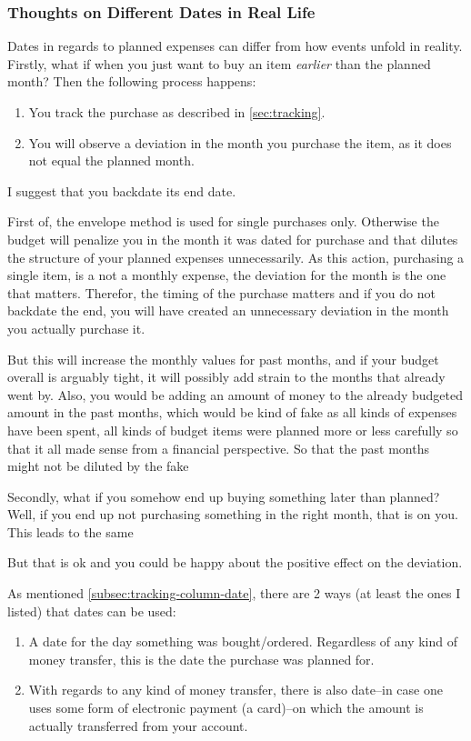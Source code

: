 \subsubsection{Thoughts on Different Dates in Real Life}
\label{subsubsec:thoughts-different-dates}

Dates in regards to planned expenses can differ from how events unfold in reality.
Firstly, what if when you just want to buy an item \emph{earlier} than the planned month?
Then the following process happens:
\begin{enumerate}
	\item You track the purchase as described in \autoref{sec:tracking}.
	\item You will observe a deviation in the month you purchase the item, as it does not equal the planned month.
\end{enumerate}
I suggest that you backdate its end date.

First of, the envelope method is used for single purchases only.
Otherwise the budget will penalize you in the month it was dated for purchase and that dilutes the structure of your planned expenses unnecessarily.
As this action, \ie purchasing a single item, is a not a monthly expense, the deviation for the month is the one that matters.
Therefor, the timing of the purchase matters and if you do not backdate the end, you will have created an unnecessary deviation in the month you actually purchase it.

But this will increase the monthly values for past months, and if your budget overall is arguably tight, it will possibly add strain to the months that already went by.
Also, you would be adding an amount of money to the already budgeted amount in the past months, which would be kind of fake as all kinds of expenses have been spent, all kinds of budget items were planned more or less carefully so that it all made sense from a financial perspective.
So that the past months might not be diluted by the fake 

Secondly, what if you somehow end up buying something later than planned?
Well, if you end up not purchasing something in the right month, that is on you.
This leads to the same 

But that is ok and you could be happy about the positive effect on the deviation.

As mentioned \autoref{subsec:tracking-column-date}, there are 2 ways (at least the ones I listed) that dates can be used:
\begin{enumerate}
	\item A date for the day something was bought/ordered.
	Regardless of any kind of money transfer, this is the date the purchase was planned for.
	\item With regards to any kind of money transfer, there is also date--in case one uses some form of electronic payment (\eg a card)--on which the amount is actually transferred from your account.
\end{enumerate}

